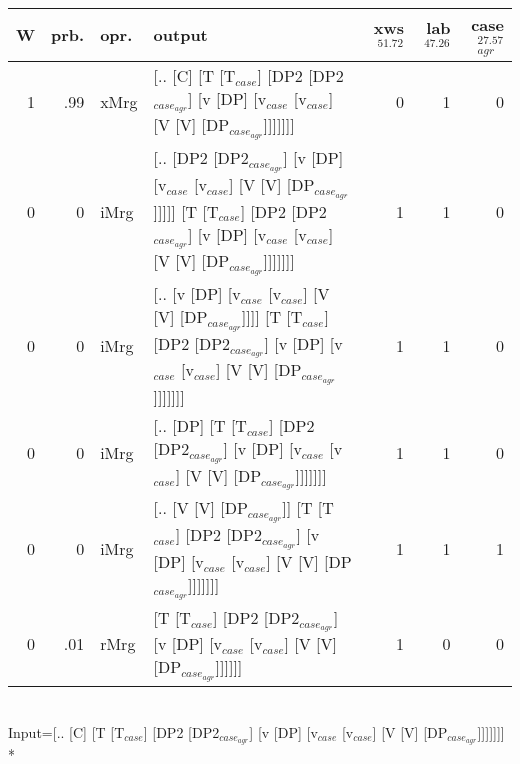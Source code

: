 \begin{tabularx}{\linewidth}{rrlXrrr}
\hline
   W &   prb. & opr.   & output                                                                                                                                                        &   xws$^{51.72}$ &   lab$^{47.26}$ &   case$_{agr}^{27.57}$ \\
\hline
   1 &   .99 & xMrg & [.. [C] [T [T$_{case}$] [DP2 [DP2$_{case_{agr}}$] [v [DP] [v$_{case}$ [v$_{case}$] [V [V] [DP$_{case_{agr}}$]]]]]]]                                                                   &             0 &             1 &                  0 \\
   0 &   0 & iMrg & [.. [DP2 [DP2$_{case_{agr}}$] [v [DP] [v$_{case}$ [v$_{case}$] [V [V] [DP$_{case_{agr}}$]]]]] [T [T$_{case}$] [DP2 [DP2$_{case_{agr}}$] [v [DP] [v$_{case}$ [v$_{case}$] [V [V] [DP$_{case_{agr}}$]]]]]]] &             1 &             1 &                  0 \\
   0 &   0 & iMrg & [.. [v [DP] [v$_{case}$ [v$_{case}$] [V [V] [DP$_{case_{agr}}$]]]] [T [T$_{case}$] [DP2 [DP2$_{case_{agr}}$] [v [DP] [v$_{case}$ [v$_{case}$] [V [V] [DP$_{case_{agr}}$]]]]]]]                      &             1 &             1 &                  0 \\
   0 &   0 & iMrg & [.. [DP] [T [T$_{case}$] [DP2 [DP2$_{case_{agr}}$] [v [DP] [v$_{case}$ [v$_{case}$] [V [V] [DP$_{case_{agr}}$]]]]]]]                                                                  &             1 &             1 &                  0 \\
   0 &   0 & iMrg & [.. [V [V] [DP$_{case_{agr}}$]] [T [T$_{case}$] [DP2 [DP2$_{case_{agr}}$] [v [DP] [v$_{case}$ [v$_{case}$] [V [V] [DP$_{case_{agr}}$]]]]]]]                                                 &             1 &             1 &                  1 \\
   0 &   .01 & rMrg & [T [T$_{case}$] [DP2 [DP2$_{case_{agr}}$] [v [DP] [v$_{case}$ [v$_{case}$] [V [V] [DP$_{case_{agr}}$]]]]]]                                                                            &             1 &             0 &                  0 \\
\hline
\end{tabularx}\endgroup\\
\begingroup\scriptsize Input=[.. [C] [T [T$_{case}$] [DP2 [DP2$_{case_{agr}}$] [v [DP] [v$_{case}$ [v$_{case}$] [V [V] [DP$_{case_{agr}}$]]]]]]]\\*
